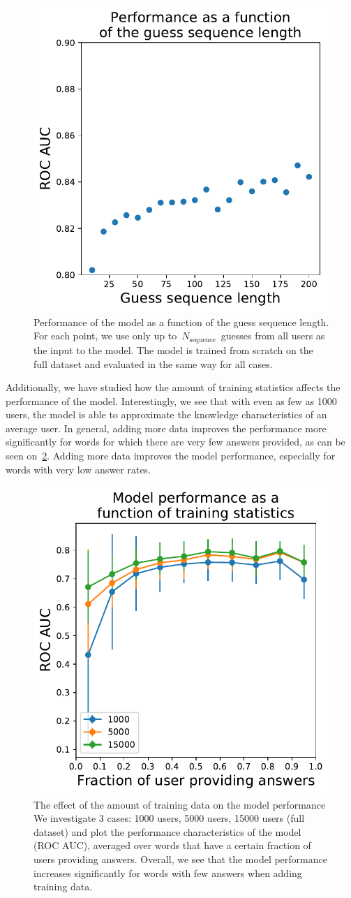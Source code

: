 \begin{figure}[ht]
\centering
\includegraphics[width=0.5\linewidth]{figures/lingvist/seq_length.pdf}
\caption[Performance as a function of sequence length.]{Performance of the model as a function of the guess sequence length. For each point, we use only up to~$N_{\mathrm{sequence}}$~guesses from all users as the input to the model. The model is trained from scratch on the full dataset and evaluated in the same way for all cases.} 
\label{fig:seq_length} 
\end{figure} 

Additionally, we have studied how the amount of training statistics affects the performance of the model. Interestingly, we see that with even as few as 1000 users, the model is able to approximate the knowledge characteristics of an average user. In general, adding more data improves the performance more significantly for words for which there are very few answers provided, as can be seen on~\cref{fig:statistics}. Adding more data improves the model performance, especially for words with very low answer rates.

\begin{figure}[ht]
\centering
\includegraphics[width=0.5\linewidth]{figures/lingvist/statistics.pdf}
\caption[The effect of training statistics on the model performance.]{The effect of the amount of training data on the model performance We investigate 3 cases: 1000 users, 5000 users, 15000 users (full dataset) and plot the performance characteristics of the model (ROC AUC), averaged over words that have a certain fraction of users providing answers. Overall, we see that the model performance increases significantly for words with few answers when adding training data.}
\label{fig:statistics}
\end{figure}

